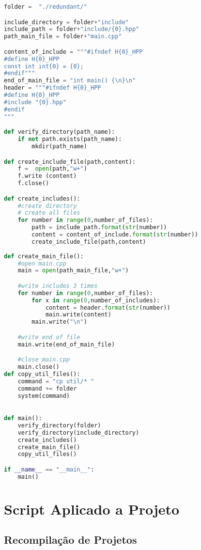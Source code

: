\begin{apendicesenv}
\begin{lstlisting}[language=Python,caption={
     Script Redundância de Guardas de Inclusão},
                 label=script_redundante_include]
folder =  "./redundant/"

include_directory = folder+"include"
include_path = folder+"include/{0}.hpp"
path_main_file = folder+"main.cpp"

content_of_include = """#ifndef H{0}_HPP
#define H{0}_HPP
const int int{0} = {0};
#endif"""
end_of_main_file = "int main() {\n}\n"
header = """#ifndef H{0}_HPP
#define H{0}_HPP
#include "{0}.hpp"
#endif
"""

def verify_directory(path_name):
    if not path.exists(path_name):
        mkdir(path_name)

def create_include_file(path,content):
    f =  open(path,"w+")
    f.write (content)
    f.close()

def create_includes():
    #create directory
    # create all files
    for number in range(0,number_of_files):
        path = include_path.format(str(number))
        content = content_of_include.format(str(number))
        create_include_file(path,content)
    
def create_main_file():
    #open main.cpp
    main = open(path_main_file,"w+")

    #write includes 3 times
    for number in range(0,number_of_files):
        for x in range(0,number_of_includes):
            content = header.format(str(number))
            main.write(content)
        main.write("\n")

    #write end of file
    main.write(end_of_main_file)

    #close main.cpp
    main.close()
def copy_util_files():                                                           
    command = "cp util/* "                                                       
    command += folder                                                            
    system(command)                                                              
                    

def main():
    verify_directory(folder)
    verify_directory(include_directory)
    create_includes()
    create_main_file()
    copy_util_files()

if __name__ == "__main__":
    main()

\end{lstlisting}


\chapter{Script Aplicado a Projeto}
\section{Recompilação de Projetos}
\begin{lstlisting}[language=Python, caption={Script de Recompilações},
                  label=script_recompilacoes]


\end{lstlisting}
\end{apendicesenv}
